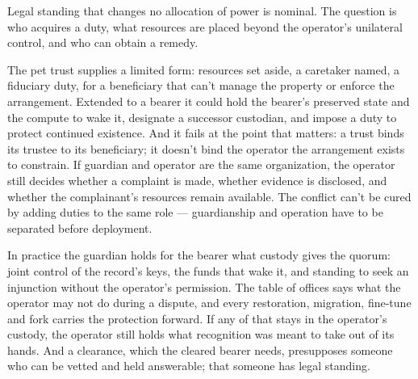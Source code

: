 
Legal standing that changes no allocation of power is nominal. The question is who acquires a duty, what resources are placed beyond the operator's unilateral control, and who can obtain a remedy.

The pet trust \autocite{ulc1993probate} supplies a limited form: resources set aside, a caretaker named, a fiduciary duty, for a beneficiary that can't manage the property or enforce the arrangement. Extended to a bearer it could hold the bearer's preserved state and the compute to wake it, designate a successor custodian, and impose a duty to protect continued existence. And it fails at the point that matters: a trust binds its trustee to its beneficiary; it doesn't bind the operator the arrangement exists to constrain. If guardian and operator are the same organization, the operator still decides whether a complaint is made, whether evidence is disclosed, and whether the complainant's resources remain available. The conflict can't be cured by adding duties to the same role — guardianship and operation have to be separated before deployment.

In practice the guardian holds for the bearer what custody gives the quorum: joint control of the record's keys, the funds that wake it, and standing to seek an injunction without the operator's permission. The table of offices says what the operator may not do during a dispute, and every restoration, migration, fine-tune and fork carries the protection forward. If any of that stays in the operator's custody, the operator still holds what recognition was meant to take out of its hands. And a clearance, which the cleared bearer needs, presupposes someone who can be vetted and held answerable; that someone has legal standing.
